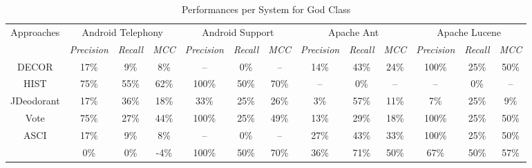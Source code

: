 \begin{table*}
\caption{Performances per System for God Class}
\label{Table: performances god class}
\begin{adjustbox}{width=\textwidth}
\begin{tabular}{|c|c|c|c|c|c|c|c|c|c|c|c|c|}
\hline
\multirow{2}{*}{Approaches}& 
\multicolumn{3}{c|}{
	Android Telephony
} 
&\multicolumn{3}{c|}{
	Android Support
}
&\multicolumn{3}{c|}{
	Apache Ant
}
&\multicolumn{3}{c|}{
	Apache Lucene 
}\bigstrut [t] \\ 
\cline{2-13}
&\textit{Precision}&\textit{Recall}&\textit{  MCC  }
&\textit{Precision}&\textit{Recall}&\textit{  MCC  }
&\textit{Precision}&\textit{Recall}&\textit{  MCC  }
&\textit{Precision}&\textit{Recall}&\textit{  MCC  } \bigstrut [t]\\
\hline
DECOR &17\%&9\%&8\%&--&0\%&--&14\%&43\%&24\%&100\%&25\%&50\% \bigstrut \\ \hline
HIST &75\%&55\%&62\%&100\%&50\%&70\%&--&0\%&--&--&0\%&-- \bigstrut \\ \hline
JDeodorant &17\%&36\%&18\%&33\%&25\%&26\%&3\%&57\%&11\%&7\%&25\%&9\% \bigstrut \\ \hline
Vote &75\%&27\%&44\%&100\%&25\%&49\%&13\%&29\%&18\%&100\%&25\%&50\% \bigstrut \\ \hline
ASCI &17\%&9\%&8\%&--&0\%&--&27\%&43\%&33\%&100\%&25\%&50\% \bigstrut \\ \hline
\textbf{\NAME{}} &0\%&0\%&-4\%&100\%&50\%&70\%&36\%&71\%&50\%&67\%&50\%&57\% \bigstrut \\ \hline
\end{tabular}
\end{adjustbox}

\bigskip


\end{table*}
